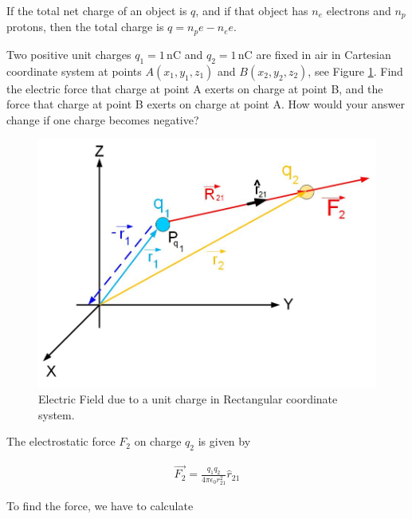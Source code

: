 \documentclass{ximera}
\begin{document}
If the total net charge of an object is $q$, and if that object has $n_e$ electrons and $n_p$ protons, then the total charge is $q=n_p e-n_e e$. 



\begin{example} 
Two positive unit charges $q_1=1$\,nC and $q_2=1$\,nC are fixed in air in Cartesian coordinate system at points $A(x_1,y_1,z_1)$ and $B(x_2,y_2,z_2)$, see Figure \ref{FigTwoCharges}. Find the electric force that charge at point A exerts on charge at point B, and the force that charge at point B exerts on charge at point A. How would your answer change if one charge becomes negative? 



\begin{figure}[htbp]
\begin{center}
\includegraphics[scale=0.5]{../jpg/twochargecartcoordFORCE.jpg}
\end{center}
\caption{Electric Field due to a unit charge in Rectangular coordinate system.}
\label{FigTwoCharges}
\end{figure}

\begin{explanation}

The electrostatic force $F_2$ on charge $q_2$ is given by 




\begin{eqnarray}
\vec{F_2}=\frac{q_1 q_2}{4 \pi \epsilon_0 r_{21}^2} \hat{r}_{21}
\end{eqnarray}

 To find the force, we have to calculate


\end{explanation}
\end{example}
\end{document}
